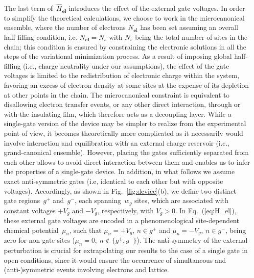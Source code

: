 \documentclass[10pt,a4paper]{article}
\begin{document}
The last term of~$\hat{H}_{\textbf{el}}$ introduces the effect of the external gate voltages. In order to simplify the theoretical calculations, we choose to work in the microcanonical ensemble, where the number of electrons $N_{\textbf{el}}$ has been set assuming an overall half-filling condition, i.e. ${N_{\textbf{el}} = N_{s}}$ with $N_{s}$ being the total number of sites in the chain; this condition is ensured by constraining the electronic solutions in all the steps of the variational minimization process. As a result of imposing global half-filling (i.e., charge neutrality under our assumptions), the effect of the gate voltages is limited to the redistribution of electronic charge within the system, favoring an excess of electron density at some sites at the expense of its depletion at other points in the chain. The microcanonical constraint is equivalent to disallowing electron transfer events, or any other direct interaction, through or with the insulating film, which therefore acts as a decoupling layer. While a single-gate version of the device may be  simpler to realize from the  experimental point of view, it becomes theoretically more complicated as it necessarily would involve interaction and equilibration with an external charge reservoir (i.e., grand-canonical ensemble). However, placing the gates sufficiently separated from each other allows to avoid direct interaction between them and enables us to infer the properties of a single-gate device. In addition, in what follows we assume exact anti-symmetric gates (i.e, identical to each other but with opposite voltages). Accordingly, as shown in Fig.~\ref{fig:device}(b), we define two distinct gate regions~$g^{+}$ and~$g^{-}$, each spanning~$w_{g}$ sites, which are associated with constant voltages $+V_{g}$ and $-V_{g}$, respectively, with ${V_{g} > 0}$. In Eq.~(\ref{eq:H_el}), these external gate voltages are encoded in a phenomenological site-dependent chemical potential~$\mu_{n}$, such that ${\mu_{n} = +V_{g},~ n \in g^{+}}$ and ${\mu_{n} = -V_{g},~ n \in g^{-}}$, being zero for non-gate sites (${\mu_{n} = 0 ,~ n \notin \{g^{+}, g^{-}\}}$). The anti-symmetry of the external perturbation is crucial for extrapolating our results to the case of a single gate in open conditions, since it would ensure the occurrence of simultaneous and (anti-)symmetric events involving electrons and lattice.
\end{document}
